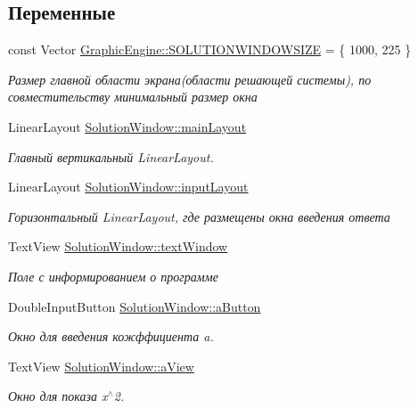 \subsection*{Переменные}
\begin{DoxyCompactItemize}
\item 
const Vector \hyperlink{group___u_i_gaa5d97e29cf14f8fd13ff22d209ae9785}{GraphicEngine::SOLUTIONWINDOWSIZE} = \{ 1000, 225 \}
\begin{DoxyCompactList}\small\item\em Размер главной области экрана(области решающей системы), по совместительству минимальный размер окна \item\end{DoxyCompactList}\item 
LinearLayout \hyperlink{group___u_i_ga22e650d520c660766cd052b6ba1fb74e}{SolutionWindow::mainLayout}
\begin{DoxyCompactList}\small\item\em Главный вертикальный LinearLayout. \item\end{DoxyCompactList}\item 
LinearLayout \hyperlink{group___u_i_gaf225d99589899b4bef32ce968002032e}{SolutionWindow::inputLayout}
\begin{DoxyCompactList}\small\item\em Горизонтальный LinearLayout, где размещены окна введения ответа \item\end{DoxyCompactList}\item 
TextView \hyperlink{group___u_i_gae4813ff258c826e4956286e327f16044}{SolutionWindow::textWindow}
\begin{DoxyCompactList}\small\item\em Поле с информированием о программе \item\end{DoxyCompactList}\item 
DoubleInputButton \hyperlink{group___u_i_gacd00c79fbbbc007e4c15583b9508d2b4}{SolutionWindow::aButton}
\begin{DoxyCompactList}\small\item\em Окно для введения кожффициента a. \item\end{DoxyCompactList}\item 
TextView \hyperlink{group___u_i_ga7777447806a3220e12c5e41bbda00652}{SolutionWindow::aView}
\begin{DoxyCompactList}\small\item\em Окно для показа x$^\wedge$2. \item\end{DoxyCompactList}\item 

\end{DoxyCompactItemize}
